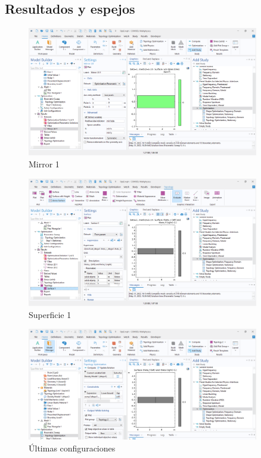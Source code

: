 \documentclass{article}
\theoremstyle{mytheoremstyle}
\theoremstyle{mytheoremstyle}
\theoremstyle{myproblemstyle}
\begin{document}
            \subsection{Resultados y espejos}
             \begin{figure}[H]
              \centering
              \includegraphics[width=0.9\textwidth]{mirror.png}
              \caption{Mirror 1}
              \label{fig:imagen_x}
            \end{figure}

 \begin{figure}[H]
              \centering
              \includegraphics[width=0.9\textwidth]{sup.png}
              \caption{Superficie 1}
              \label{fig:imagen_x}
            \end{figure}

             \begin{figure}[H]
              \centering
              \includegraphics[width=0.9\textwidth]{las.png}
              \caption{Últimas configuraciones}
              \label{fig:imagen_x}
            \end{figure}
\end{document}
